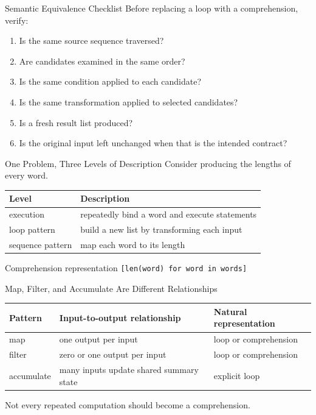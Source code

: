 \documentclass[aspectratio=169,10pt]{beamer}
\begin{document}
\begin{frame}{Semantic Equivalence Checklist}
  Before replacing a loop with a comprehension, verify:

  \begin{enumerate}
    \item Is the same source sequence traversed?
    \item Are candidates examined in the same order?
    \item Is the same condition applied to each candidate?
    \item Is the same transformation applied to selected candidates?
    \item Is a fresh result list produced?
    \item Is the original input left unchanged when that is the intended contract?
  \end{enumerate}
\end{frame}


\begin{frame}{One Problem, Three Levels of Description}
  Consider producing the lengths of every word.

  \begin{center}
    \renewcommand{\arraystretch}{1.35}
    \begin{tabular}{l|l}
      \textbf{Level} & \textbf{Description} \\\hline
      execution & repeatedly bind a word and execute statements \\
      loop pattern & build a new list by transforming each input \\
      sequence pattern & map each word to its length
    \end{tabular}
  \end{center}

  \begin{block}{Comprehension representation}
    \centering
    \texttt{[len(word) for word in words]}
  \end{block}
\end{frame}

\begin{frame}{Map, Filter, and Accumulate Are Different Relationships}
  \begin{center}
    \renewcommand{\arraystretch}{1.3}
    \begin{tabular}{l|l|l}
      \textbf{Pattern} & \textbf{Input-to-output relationship} & \textbf{Natural representation} \\\hline
      map & one output per input & loop or comprehension \\
      filter & zero or one output per input & loop or comprehension \\
      accumulate & many inputs update shared summary state & explicit loop
    \end{tabular}
  \end{center}

  \begin{keyidea}
    Not every repeated computation should become a comprehension.
  \end{keyidea}
\end{frame}
\end{document}
